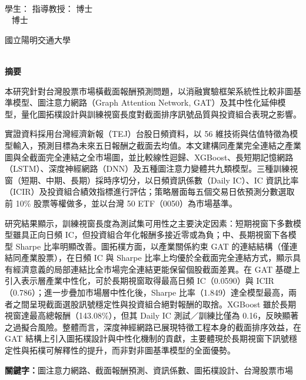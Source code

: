 \begin{center}
    \large
    \begin{singlespace}    
        \textbf{\chineseTitle{}} \\[0.5cm]
    \end{singlespace}

    \begin{singlespace}    
    學生：\studentCnName  \hspace{2.5cm}  指導教授：\advisorCnName \hspace{0.1cm} 博士 \\

    \ifdefined\advisorCnNameB %
        \hspace{9.6cm}  \advisorCnNameB ~ 博士 \\
    \fi
    \end{singlespace}

    \vspace{0.5cm}

    \begin{singlespace}
        國立陽明交通大學\\
        \NameofDepartmentInstituteCN\\[0.2cm]
    \end{singlespace}

    \textbf{摘\hspace{1cm}要} \\[0.5cm]

\end{center}

\normalsize 

本研究針對台灣股票市場橫截面報酬預測問題，以消融實驗框架系統性比較非圖基準模型、圖注意力網路（Graph Attention Network, GAT）及其中性化延伸模型，量化圖拓樸設計與訓練視窗長度對截面排序訊號品質與投資組合表現之影響。

實證資料採用台灣經濟新報（TEJ）台股日頻資料，以 56 維技術與估值特徵為模型輸入，預測目標為未來五日報酬之截面去均值。本文建構同產業完全連結之產業圖與全截面完全連結之全市場圖，並比較線性迴歸、XGBoost、長短期記憶網路（LSTM）、深度神經網路（DNN）及五種圖注意力變體共九類模型。三種訓練視窗（短期、中期、長期）採時序切分，以日頻資訊係數（Daily IC）、IC 資訊比率（ICIR）及投資組合績效指標進行評估；策略層面每五個交易日依預測分數選取前 10\% 股票等權做多，並以台灣 50 ETF（0050）為市場基準。

研究結果顯示，訓練視窗長度為測試集可用性之主要決定因素：短期視窗下多數模型雖具正向日頻 IC，但投資組合年化報酬多接近零或為負；中、長期視窗下各模型 Sharpe 比率明顯改善。圖拓樸方面，以產業關係約束 GAT 的連結結構（僅連結同產業股票），在日頻 IC 與 Sharpe 比率上均優於全截面完全連結方式，顯示具有經濟意義的局部連結比全市場完全連結更能保留個股截面差異。在 GAT 基礎上引入表示層產業中性化，可於長期視窗取得最高日頻 IC（0.0590）與 ICIR（0.786）；進一步疊加市場層中性化後，Sharpe 比率（1.849）達全模型最高，兩者之間呈現截面選股訊號穩定性與投資組合絕對報酬的取捨。XGBoost 雖於長期視窗達最高總報酬（143.08\%），但其 Daily IC 測試／訓練比僅為 0.16，反映顯著之過擬合風險。整體而言，深度神經網路已展現特徵工程本身的截面排序效益，在 GAT 結構上引入圖拓樸設計與中性化機制的貢獻，主要體現於長期視窗下訊號穩定性與拓樸可解釋性的提升，而非對非圖基準模型的全面優勢。

\vspace{1cm}

\textbf{關鍵字：}圖注意力網路、截面報酬預測、資訊係數、圖拓樸設計、台灣股票市場
